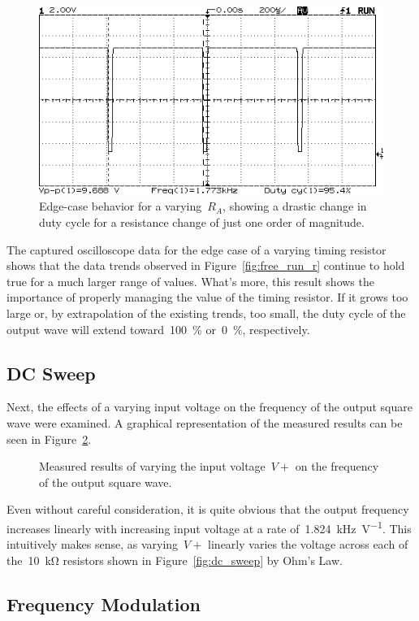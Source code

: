 \begin{figure}[H]
	\centering
	\includegraphics[width=.6\textwidth]{img/shot/shot3.png}
	\parbox{.6\textwidth}{
	\caption[Free Running Oscillator --- Varying $R_A$ at \SI{95.2}{\percent}
	Duty Cycle]{Edge-case behavior for a varying~$R_A$, showing a drastic
	change in duty cycle for a resistance change of just one order of
	magnitude.}
	\label{fig:shot3}}
\end{figure}
%
The captured oscilloscope data for the edge case of a varying timing resistor
shows that the data trends observed in Figure~\ref{fig:free_run_r} continue to
hold true for a much larger range of values.  What's more, this result shows
the importance of properly managing the value of the timing resistor.  If it
grows too large or, by extrapolation of the existing trends, too small, the
duty cycle of the output wave will extend toward~\SI{100}{\percent}
or~\SI{0}{\percent}, respectively.

\subsection{DC Sweep}
Next, the effects of a varying input voltage on the frequency of the output
square wave were examined.  A graphical representation of the measured results
can be seen in Figure~\ref{fig:dc_sweep_plot}.
%
\begin{figure}[H]
	\centering
	
	\parbox{.6\textwidth}{
	\caption[DC Sweep Results]{Measured results of varying the input
	voltage~$V+$ on the frequency of the output square wave.}
	\label{fig:dc_sweep_plot}}
\end{figure}
%
Even without careful consideration, it is quite obvious that the output
frequency increases linearly with increasing input voltage at a rate
of~\SI{1.824}{\kilo\hertz\per\volt}.  This intuitively makes sense, as
varying~$V+$ linearly varies the voltage across each of the~\SI{10}{\kilo\ohm}
resistors shown in Figure~\ref{fig:dc_sweep} by Ohm's Law.

\subsection{Frequency Modulation}
\begin{figure}[H]
	\centering
	
\end{figure}
